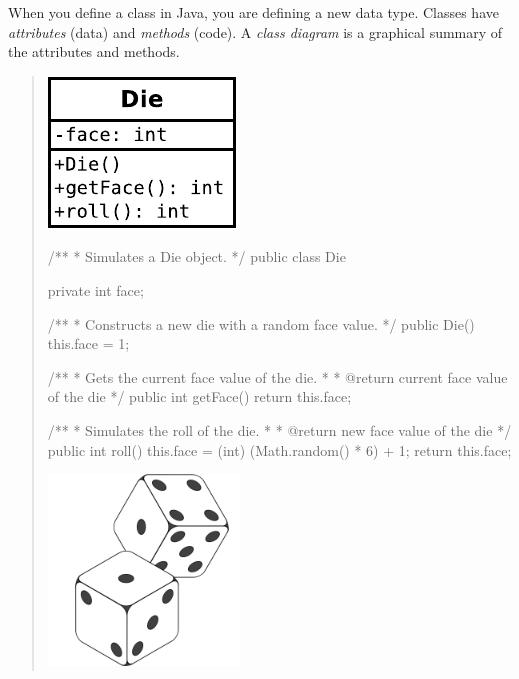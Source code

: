 \label{class-die}

When you define a class in Java, you are defining a new data type.
Classes have \emph{attributes} (data) and \emph{methods} (code).
A \emph{class diagram} is a graphical summary of the attributes and methods.

\vspace{1em}
\begin{quote}
\hfill\includegraphics{Die.pdf}
\vspace*{-84pt}

\begin{javalst}
/**
 * Simulates a Die object.
 */
public class Die {
    
    private int face;
    
    /**
     * Constructs a new die with a random face value.
     */
    public Die() {
        this.face = 1;
    }
    
    /**
     * Gets the current face value of the die.
     *
     * @return current face value of the die
     */
    public int getFace() {
        return this.face;
    }
    
    /**
     * Simulates the roll of the die.
     *
     * @return new face value of the die
     */
    public int roll() {
        this.face = (int) (Math.random() * 6) + 1;
        return this.face;
    }
    
}
\end{javalst}

\vspace*{-128pt}
\hfill\includegraphics[width=2in]{dice.png}
\end{quote}


